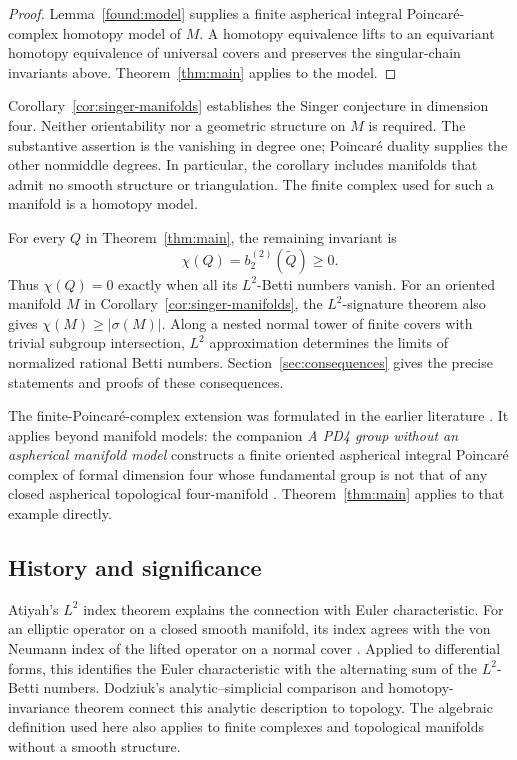 \begin{proof}
Lemma~\ref{found:model} supplies a finite aspherical integral
Poincar\'e-complex homotopy model of $M$. A homotopy equivalence lifts to
an equivariant homotopy equivalence of universal covers and preserves
the singular-chain invariants above. Theorem~\ref{thm:main} applies to
the model.
\end{proof}

Corollary~\ref{cor:singer-manifolds} establishes the Singer conjecture
in dimension four. Neither orientability nor a geometric structure on
$M$ is required. The substantive assertion is the vanishing in degree
one; Poincar\'e duality supplies the other nonmiddle degrees. In
particular, the corollary includes manifolds that admit no smooth
structure or triangulation. The finite complex used for such a manifold
is a homotopy model.

For every $Q$ in Theorem~\ref{thm:main}, the remaining invariant is
\[
 \chi(Q)=b_2^{(2)}(\widetilde Q)\ge0.
\]
Thus $\chi(Q)=0$ exactly when all its $L^2$-Betti numbers vanish.
For an oriented manifold $M$ in Corollary~\ref{cor:singer-manifolds},
the $L^2$-signature theorem also gives $\chi(M)\ge|\sigma(M)|$.
Along a nested normal tower of finite
covers with trivial subgroup intersection, $L^2$ approximation determines
the limits of normalized rational Betti numbers. Section~\ref{sec:consequences}
gives the precise statements and proofs of these consequences.

The finite-Poincar\'e-complex extension was formulated in the earlier
literature \cite[Remark~11.3]{Luck2016Approximation}.
It applies beyond manifold models: the companion
\emph{A PD4 group without an aspherical manifold model} constructs a
finite oriented aspherical integral Poincar\'e complex of formal dimension
four whose fundamental group is not that of any closed aspherical
topological four-manifold
\cite[Theorem~1.1]{OpenAIPD4Nonmanifold2026}.
Theorem~\ref{thm:main} applies to that example directly.

\subsection{History and significance}
Atiyah's $L^2$ index theorem explains the connection with Euler
characteristic.
For an elliptic operator on a closed smooth manifold, its index agrees
with the von Neumann index of the lifted operator on a normal cover
\cite[Theorem~3.8 and Section~6.4]{Atiyah1976}.
Applied to differential forms, this identifies the Euler characteristic
with the alternating sum of the $L^2$-Betti numbers. Dodziuk's
analytic--simplicial comparison and homotopy-invariance theorem
\cite[Theorems~1--2]{Dodziuk1977} connect this analytic description to
topology. The algebraic definition used here also applies to finite
complexes and topological manifolds without a smooth structure.

